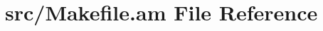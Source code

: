 \hypertarget{src_2_makefile_8am}{\section{src/\+Makefile.am File Reference}
\label{src_2_makefile_8am}
}
